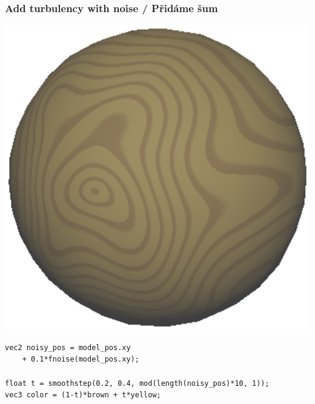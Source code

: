 \begin{frame}[fragile]\frametitle{Add turbulency with noise / Přidáme šum}
  \includegraphics[width=.3\textwidth]{pics/procedural/drevo.eps}

\begin{verbatim}
vec2 noisy_pos = model_pos.xy
    + 0.1*fnoise(model_pos.xy);

float t = smoothstep(0.2, 0.4, mod(length(noisy_pos)*10, 1));
vec3 color = (1-t)*brown + t*yellow;
  \end{verbatim}
\end{frame}

